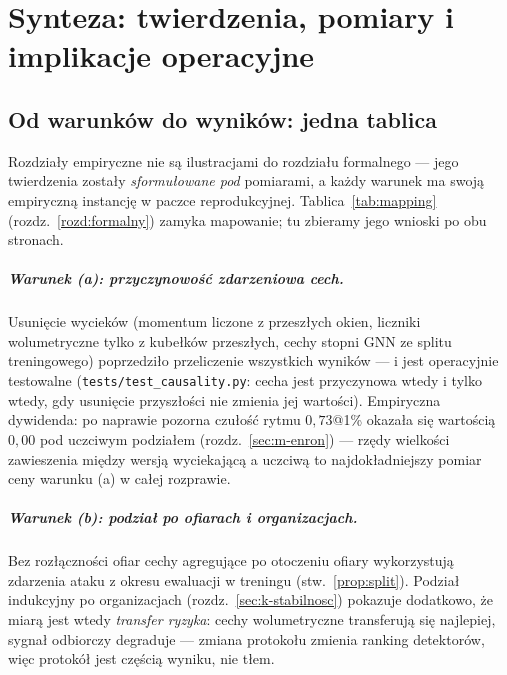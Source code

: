 \chapter{Synteza: twierdzenia, pomiary i implikacje operacyjne}
\label{rozd:synteza}

\section{Od warunków do wyników: jedna tablica}
\label{sec:s-mapa}

Rozdziały empiryczne nie są ilustracjami do rozdziału formalnego ---
jego twierdzenia zostały \emph{sformułowane pod} pomiarami, a każdy
warunek ma swoją empiryczną instancję w paczce reprodukcyjnej.
Tablica~\ref{tab:mapping} (rozdz.~\ref{rozd:formalny}) zamyka
mapowanie; tu zbieramy jego wnioski po obu stronach.

\paragraph{Warunek (a): przyczynowość zdarzeniowa cech.} Usunięcie
wycieków (momentum liczone z przeszłych okien, liczniki wolumetryczne
tylko z kubełków przeszłych, cechy stopni GNN ze splitu
treningowego) poprzedziło przeliczenie wszystkich wyników --- i jest
operacyjnie testowalne (\texttt{tests/test\_causality.py}: cecha
jest przyczynowa wtedy i tylko wtedy, gdy usunięcie przyszłości nie
zmienia jej wartości). Empiryczna dywidenda: po naprawie pozorna
czułość rytmu $0{,}73$@1\% okazała się wartością $0{,}00$ pod
uczciwym podziałem (rozdz.~\ref{sec:m-enron}) --- rzędy wielkości
zawieszenia między wersją wyciekającą a uczciwą to najdokładniejszy
pomiar ceny warunku (a) w całej rozprawie.

\paragraph{Warunek (b): podział po ofiarach i organizacjach.}
Bez rozłączności ofiar cechy agregujące po otoczeniu ofiary
wykorzystują zdarzenia ataku z okresu ewaluacji w treningu
(stw.~\ref{prop:split}). Podział indukcyjny po organizacjach
(rozdz.~\ref{sec:k-stabilnosc}) pokazuje dodatkowo, że miarą
jest wtedy \emph{transfer ryzyka}: cechy wolumetryczne
transferują się najlepiej, sygnał odbiorczy degraduje --- zmiana
protokołu zmienia ranking detektorów, więc protokół jest częścią
wyniku, nie tłem.

